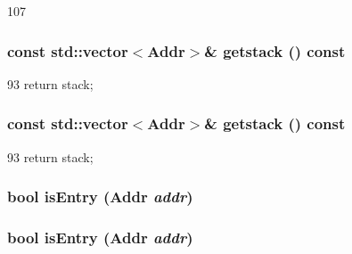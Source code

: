 \begin{DoxyCode}
107 {}
\end{DoxyCode}
\hypertarget{classMipsISA_1_1StackTrace_aceb93ba31a3756aca859b4643efeeb46}{
\subsubsection[{getstack}]{\setlength{\rightskip}{0pt plus 5cm}const {\bf std::vector}$<${\bf Addr}$>$\& getstack () const}}
\label{classMipsISA_1_1StackTrace_aceb93ba31a3756aca859b4643efeeb46}



\begin{DoxyCode}
93 { return stack; }
\end{DoxyCode}
\hypertarget{classMipsISA_1_1StackTrace_aceb93ba31a3756aca859b4643efeeb46}{
\subsubsection[{getstack}]{\setlength{\rightskip}{0pt plus 5cm}const {\bf std::vector}$<${\bf Addr}$>$\& getstack () const}}
\label{classMipsISA_1_1StackTrace_aceb93ba31a3756aca859b4643efeeb46}



\begin{DoxyCode}
93 { return stack; }
\end{DoxyCode}
\hypertarget{classMipsISA_1_1StackTrace_a8c9787d05f9c0e82dfcaf31cf0fd4b50}{
\subsubsection[{isEntry}]{\setlength{\rightskip}{0pt plus 5cm}bool isEntry ({\bf Addr} {\em addr})}}
\label{classMipsISA_1_1StackTrace_a8c9787d05f9c0e82dfcaf31cf0fd4b50}
\hypertarget{classMipsISA_1_1StackTrace_a8c9787d05f9c0e82dfcaf31cf0fd4b50}{
\subsubsection[{isEntry}]{\setlength{\rightskip}{0pt plus 5cm}bool isEntry ({\bf Addr} {\em addr})}}
\label{classMipsISA_1_1StackTrace_a8c9787d05f9c0e82dfcaf31cf0fd4b50}



